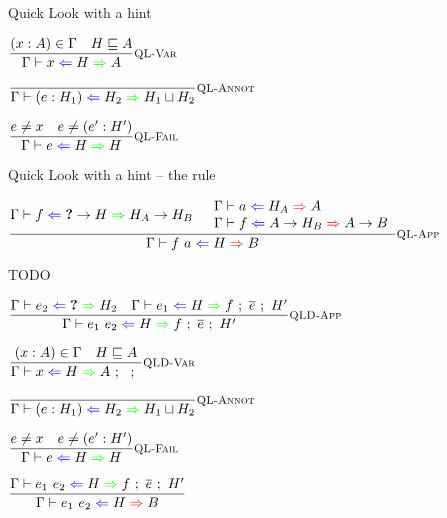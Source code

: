 \documentclass{beamer}
\begin{document}

\begin{frame}{Quick Look with a hint}

\begin{center}
  $\infrule[QL-Var]{\sidecond{(x : A) \in \Gamma} \quad \sidecond{\hintorder{H}{A}}}{\quicklookhinting{x}{H}{A}}$

  \vspace{2em}

  $\infrule[QL-Annot]{}{\quicklookhinting{\annot{e}{H_1}}{H_2}{\hintlub{H_1}{H_2}}}$

  \vspace{2em}

  $\infrule[QL-Fail]{\sidecond{e \neq x} \quad \sidecond{e \neq \annot{e'}{H'}}}{\quicklookhinting{e}{H}{H}}$
\end{center}

\end{frame}

\begin{frame}{Quick Look with a hint -- the rule}

\begin{center}
  $\infrule[QL-App]{\quicklookhinting{f}{\Fun{\Hole}{H}}{\Fun{H_A}{H_B}} \quad \begin{array}{l} \hinting{a}{H_A}{A} \\ \hinting{f}{\Fun{A}{H_B}}{\Fun{A}{B}} \end{array}}{\hinting{\app{f}{a}}{H}{B}}$
\end{center}

\end{frame}


\begin{frame}{TODO}

\begin{center}
  $\infrule[QLD-App]{\quicklookhinting{e_2}{\Hole}{H_2} \quad \qldeep{e_1}{H}{f}{\overline{e}}{H'}}{\qldeep{\app{e_1}{e_2}}{H}{f}{\overline{e}}{H'}}$

  \vspace{2em}

  $\infrule[QLD-Var]{\sidecond{(x : A) \in \Gamma} \quad \sidecond{\hintorder{H}{A}}}{\qldeep{x}{H}{A}{}{}{}}$

  \vspace{2em}

  $\infrule[QL-Annot]{}{\quicklookhinting{\annot{e}{H_1}}{H_2}{\hintlub{H_1}{H_2}}}$

  \vspace{2em}

  $\infrule[QL-Fail]{\sidecond{e \neq x} \quad \sidecond{e \neq \annot{e'}{H'}}}{\quicklookhinting{e}{H}{H}}$

  \vspace{2em}

  $\infrule{\qldeep{\app{e_1}{e_2}}{H}{f}{\overline{e}}{H'}}{\hinting{\app{e_1}{e_2}}{H}{B}}$
\end{center}

\end{frame}
\end{document}
